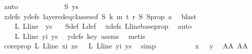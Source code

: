 \begin{isabellebody}
\ auto\isanewline
\ \ \ \ \ \ \isamarkupfalse%
\ \isamarkupfalse%
\ {\isachardoublequoteopen}\ {\isachardot}{\kern0pt}{\isachardot}{\kern0pt}{\isachardot}{\kern0pt}\ {\isacharequal}{\kern0pt}\ {\isasymchi}S\ ys{\isachardoublequoteclose}\ \isamarkupfalse%
\ xdefs\ ydefs\ layered{\isacharunderscore}{\kern0pt}eq{\isacharunderscore}{\kern0pt}classes{\isacharbrackleft}{\kern0pt}of\ S\ k\ m\ t\ r\ {\isasymchi}S{\isacharbrackright}{\kern0pt}\ S{\isacharunderscore}{\kern0pt}prop\ a\ \isamarkupfalse%
\ blast\isanewline
\ \ \ \ \ \ \isamarkupfalse%
\ \isamarkupfalse%
\ {\isachardoublequoteopen}\ {\isachardot}{\kern0pt}{\isachardot}{\kern0pt}{\isachardot}{\kern0pt}\ {\isacharequal}{\kern0pt}\ {\isasymchi}L\ {\isacharparenleft}{\kern0pt}L{\isacharunderscore}{\kern0pt}line\ {}{\isacharparenright}{\kern0pt}\ ys{\isachardoublequoteclose}\ \ \isamarkupfalse%
\ {\isasymchi}S{\isacharunderscore}{\kern0pt}def\ {\isasymchi}L{\isacharunderscore}{\kern0pt}def\ \isamarkupfalse%
\ xdefs\ L{\isacharunderscore}{\kern0pt}line{\isacharunderscore}{\kern0pt}base{\isacharunderscore}{\kern0pt}prop\ \isamarkupfalse%
\ auto\isanewline
\ \ \ \ \ \ \isamarkupfalse%
\ \isamarkupfalse%
\ {\isachardoublequoteopen}\ {\isachardot}{\kern0pt}{\isachardot}{\kern0pt}{\isachardot}{\kern0pt}\ {\isacharequal}{\kern0pt}\ {\isasymchi}L\ {\isacharparenleft}{\kern0pt}L{\isacharunderscore}{\kern0pt}line\ yi{\isacharparenright}{\kern0pt}\ ys{\isachardoublequoteclose}\ \isamarkupfalse%
\ ydefs\ key\ assms{\isacharparenleft}{\kern0pt}{}{\isacharparenright}{\kern0pt}\ \isamarkupfalse%
\ metis\isanewline
\ \ \ \ \ \ \isamarkupfalse%
\ \isamarkupfalse%
\ core{\isacharunderscore}{\kern0pt}prop{\isacharcolon}{\kern0pt}\ {\isachardoublequoteopen}{\isasymchi}L\ {\isacharparenleft}{\kern0pt}L{\isacharunderscore}{\kern0pt}line\ xi{\isacharparenright}{\kern0pt}\ xs\ {\isacharequal}{\kern0pt}\ \ {\isasymchi}L\ {\isacharparenleft}{\kern0pt}L{\isacharunderscore}{\kern0pt}line\ yi{\isacharparenright}{\kern0pt}\ ys{\isachardoublequoteclose}\ \isamarkupfalse%
\ simp\isanewline
\ \ \ \ \ \ \isamarkupfalse%
\ \isamarkupfalse%
\ {\isachardoublequoteopen}{\isasymchi}\ x\ {\isacharequal}{\kern0pt}\ {\isasymchi}\ y{\isachardoublequoteclose}\ \isamarkupfalse%
\ AA{}\ AA{}\ \isamarkupfalse%

\end{isabellebody}
